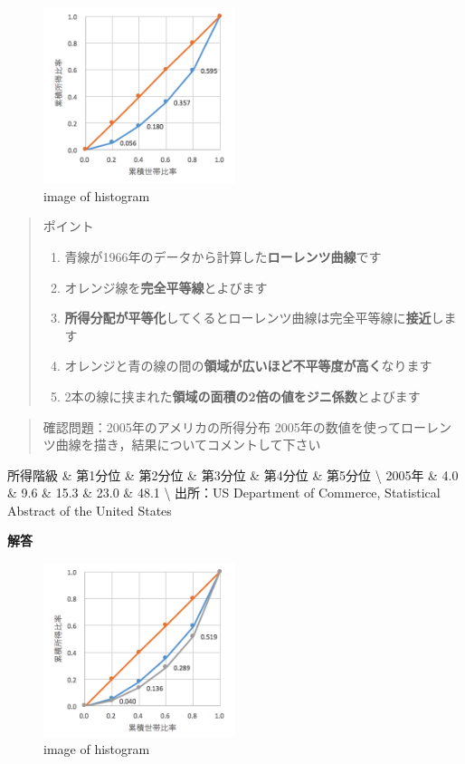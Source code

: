 \documentclass[
]{book}
\providecommand{\tightlist}{%
  \setlength{\itemsep}{0pt}\setlength{\parskip}{0pt}}
\theoremstyle{definition}
\theoremstyle{definition}
\theoremstyle{definition}
\theoremstyle{definition}
\theoremstyle{remark}
\begin{document}
\begin{figure}
\centering
\includegraphics[width=0.5\textwidth,height=\textheight]{images/lec03/fig_us_lorenz1966.png}
\caption{image of histogram}
\end{figure}

\begin{quote}
ポイント

\begin{enumerate}
\def\labelenumi{\arabic{enumi}.}
\tightlist
\item
  青線が1966年のデータから計算した\textbf{ローレンツ曲線}です
\item
  オレンジ線を\textbf{完全平等線}とよびます
\item
  \textbf{所得分配が平等化}してくるとローレンツ曲線は完全平等線に\textbf{接近}します
\item
  オレンジと青の線の間の\textbf{領域が広いほど不平等度が高く}なります
\item
  2本の線に挟まれた\textbf{領域の面積の2倍の値をジニ係数}とよびます
\end{enumerate}
\end{quote}

\begin{quote}
確認問題：2005年のアメリカの所得分布
2005年の数値を使ってローレンツ曲線を描き，結果についてコメントして下さい
\end{quote}

所得階級 \& 第1分位 \& 第2分位 \& 第3分位 \& 第4分位 \& 第5分位 \textbackslash{}
2005年 \& 4.0 \& 9.6 \& 15.3 \& 23.0 \& 48.1 \textbackslash{}
出所：US Department of Commerce, Statistical Abstract of the United States

\textbf{解答}

\begin{figure}
\centering
\includegraphics[width=0.5\textwidth,height=\textheight]{images/lec03/fig_us_lorenz2005.png}
\caption{image of histogram}
\end{figure}
\end{document}
